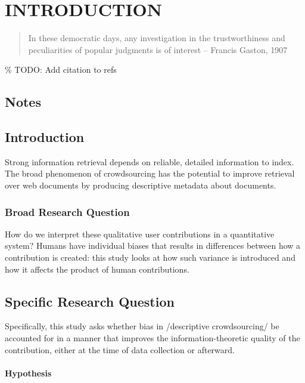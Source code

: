 \chapter{INTRODUCTION}\label{introduction}

\begin{quote}
In these democratic days, any investigation in the trustworthiness and
peculiarities of popular judgments is of interest -- Francis Gaston,
1907
\end{quote}

\% TODO: Add citation to refs

\section{Notes}\label{notes}

\section{Introduction}\label{introduction-1}

Strong information retrieval depends on reliable, detailed information
to index. The broad phenomenon of crowdsourcing has the potential to
improve retrieval over web documents by producing descriptive metadata
about documents.

\subsection{Broad Research Question}\label{broad-research-question}

How do we interpret these qualitative user contributions in a
quantitative system? Humans have individual biases that results in
differences between how a contribution is created: this study looks at
how such variance is introduced and how it affects the product of human
contributions.

\section{Specific Research Question}\label{specific-research-question}

Specifically, this study asks whether bias in /descriptive
crowdsourcing/ be accounted for in a manner that improves the
information-theoretic quality of the contribution, either at the time of
data collection or afterward.

\subsubsection{Hypothesis}\label{hypothesis}

